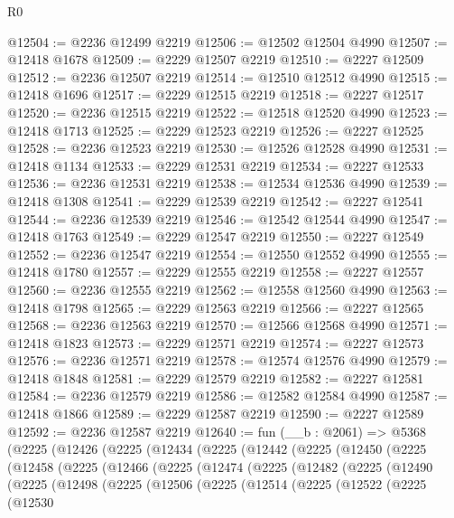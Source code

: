 \begin{lexlean}{R0}
\begin{coremodule}
@12504 := @2236 @12499 @2219
@12506 := @12502 @12504 @4990
@12507 := @12418 @1678
@12509 := @2229 @12507 @2219
@12510 := @2227 @12509
@12512 := @2236 @12507 @2219
@12514 := @12510 @12512 @4990
@12515 := @12418 @1696
@12517 := @2229 @12515 @2219
@12518 := @2227 @12517
@12520 := @2236 @12515 @2219
@12522 := @12518 @12520 @4990
@12523 := @12418 @1713
@12525 := @2229 @12523 @2219
@12526 := @2227 @12525
@12528 := @2236 @12523 @2219
@12530 := @12526 @12528 @4990
@12531 := @12418 @1134
@12533 := @2229 @12531 @2219
@12534 := @2227 @12533
@12536 := @2236 @12531 @2219
@12538 := @12534 @12536 @4990
@12539 := @12418 @1308
@12541 := @2229 @12539 @2219
@12542 := @2227 @12541
@12544 := @2236 @12539 @2219
@12546 := @12542 @12544 @4990
@12547 := @12418 @1763
@12549 := @2229 @12547 @2219
@12550 := @2227 @12549
@12552 := @2236 @12547 @2219
@12554 := @12550 @12552 @4990
@12555 := @12418 @1780
@12557 := @2229 @12555 @2219
@12558 := @2227 @12557
@12560 := @2236 @12555 @2219
@12562 := @12558 @12560 @4990
@12563 := @12418 @1798
@12565 := @2229 @12563 @2219
@12566 := @2227 @12565
@12568 := @2236 @12563 @2219
@12570 := @12566 @12568 @4990
@12571 := @12418 @1823
@12573 := @2229 @12571 @2219
@12574 := @2227 @12573
@12576 := @2236 @12571 @2219
@12578 := @12574 @12576 @4990
@12579 := @12418 @1848
@12581 := @2229 @12579 @2219
@12582 := @2227 @12581
@12584 := @2236 @12579 @2219
@12586 := @12582 @12584 @4990
@12587 := @12418 @1866
@12589 := @2229 @12587 @2219
@12590 := @2227 @12589
@12592 := @2236 @12587 @2219
@12640 := fun (__b : @2061) =>
  @5368
    (@2225
      (@12426
        (@2225
          (@12434
            (@2225
              (@12442
                (@2225
                  (@12450
                    (@2225
                      (@12458
                        (@2225
                          (@12466
                            (@2225
                              (@12474
                                (@2225
                                  (@12482
                                    (@2225
                                      (@12490
                                        (@2225
                                          (@12498
                                            (@2225
                                              (@12506
                                                (@2225
                                                  (@12514
                                                    (@2225
                                                      (@12522
                                                        (@2225
                                                          (@12530

\end{coremodule}
\end{lexlean}
